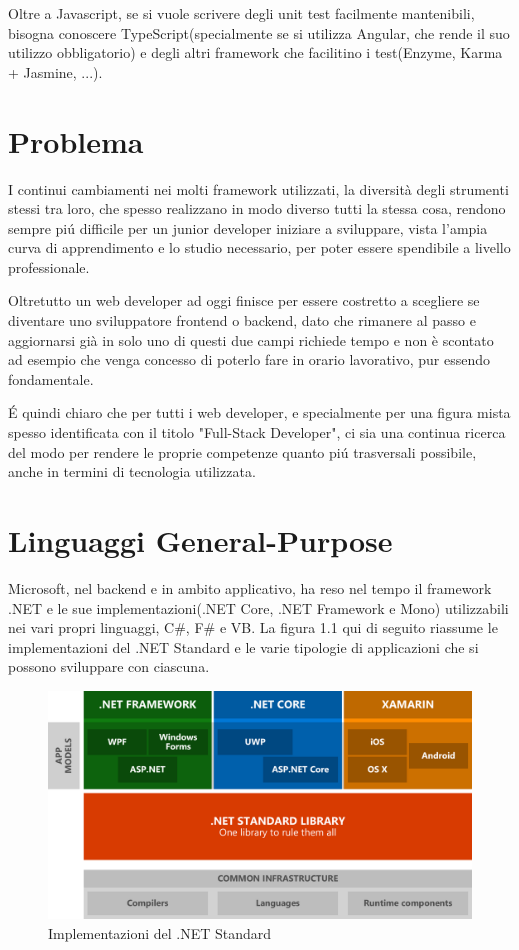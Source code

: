Oltre a Javascript, se si vuole scrivere degli unit test facilmente mantenibili, bisogna conoscere TypeScript(specialmente se si utilizza Angular, che rende il suo utilizzo obbligatorio) e degli altri framework che facilitino i test(Enzyme, Karma + Jasmine, ...).

\section{Problema}\label{sez:problema}
I continui cambiamenti nei molti framework utilizzati, la diversit\`a degli strumenti stessi tra loro, che spesso realizzano in modo diverso tutti la stessa cosa, rendono sempre pi\'u difficile per un junior developer iniziare a sviluppare, vista l'ampia curva di apprendimento e lo studio necessario, per poter essere spendibile a livello professionale.

Oltretutto un web developer ad oggi finisce per essere costretto a scegliere se diventare uno sviluppatore frontend o backend, dato che rimanere al passo e aggiornarsi gi\`a in solo uno di questi due campi richiede tempo e non \`e scontato ad esempio che venga concesso di poterlo fare in orario lavorativo, pur essendo fondamentale.

\'E quindi chiaro che per tutti i web developer, e specialmente per una figura mista spesso identificata con il titolo "Full-Stack Developer", ci sia una continua ricerca del modo per rendere le proprie competenze quanto pi\'u trasversali possibile, anche in termini di tecnologia utilizzata.

\pagebreak

\section{Linguaggi General-Purpose}\label{sez:problema}
Microsoft, nel backend e in ambito applicativo, ha reso nel tempo il framework .NET e le sue implementazioni(.NET Core, .NET Framework e Mono) utilizzabili nei vari propri linguaggi, C\#, F\# e VB.
La figura 1.1 qui di seguito riassume le implementazioni del .NET Standard e le varie tipologie di applicazioni che si possono sviluppare con ciascuna.

\begin{figure}[H]
	\centerline{\includegraphics[scale=0.2]{figure/DotNetImplementations}}
	\caption{Implementazioni del .NET Standard}
	\label{fig:DotNetImplementations}
\end{figure}

